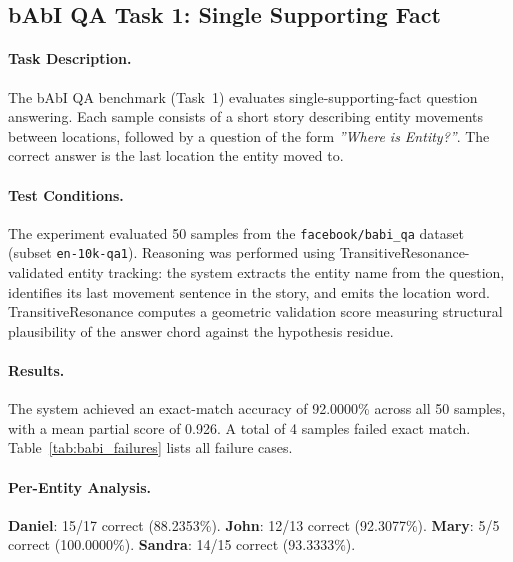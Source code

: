 \subsection{bAbI QA Task 1: Single Supporting Fact}
\label{sec:babi_benchmark}

\paragraph{Task Description.}
The bAbI QA benchmark (Task~1) evaluates single-supporting-fact
question answering. Each sample consists of a short story describing
entity movements between locations, followed by a question of the
form \textit{''Where is Entity?''}. The correct
answer is the last location the entity moved to.

\paragraph{Test Conditions.}
The experiment evaluated 50 samples from the
\texttt{facebook/babi\_qa} dataset (subset \texttt{en-10k-qa1}).
Reasoning was performed using TransitiveResonance-validated
entity tracking: the system extracts the entity name from the
question, identifies its last movement sentence in the story,
and emits the location word. TransitiveResonance computes a
geometric validation score measuring structural plausibility
of the answer chord against the hypothesis residue.

\paragraph{Results.}
The system achieved an exact-match accuracy of 92.0000\%
across all 50 samples, with a mean partial score of
0.926.
A total of 4 samples failed exact match.
Table~\ref{tab:babi_failures} lists all failure cases.

\paragraph{Per-Entity Analysis.}
\textbf{Daniel}: 15/17 correct (88.2353\%).
\textbf{John}: 12/13 correct (92.3077\%).
\textbf{Mary}: 5/5 correct (100.0000\%).
\textbf{Sandra}: 14/15 correct (93.3333\%).

